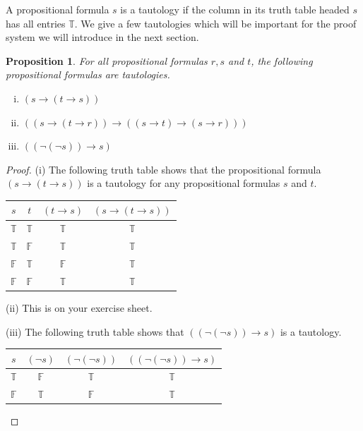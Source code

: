 \documentclass[11pt]{article}
\newtheorem{proposition}[theorem]{Proposition}
\newcommand{\F}{\mathbb{F}}
\newcommand{\T}{\mathbb{T}}
\begin{document}
A propositional formula $s$ is a tautology if the column in its truth table headed $s$ has all entries $\T$. We give a few tautologies which will be important for the proof system we will introduce in the next section.
\begin{proposition}\label{axiomsaretaut}
For all propositional formulas $r, s$ and $t$, the following propositional formulas are tautologies.
\begin{enumerate}[(i)]
\item $(s\rightarrow (t\rightarrow s))$
\item $((s\rightarrow (t\rightarrow r))\rightarrow ((s\rightarrow t)\rightarrow (s\rightarrow r)))$
\item $((\neg(\neg s))\rightarrow s)$
\end{enumerate}
\end{proposition}
\begin{proof}(i) The following truth table shows that the propositional formula $(s\rightarrow (t\rightarrow s))$ is a tautology for any propositional formulas $s$ and $t$.

\medskip
\begin{tabular}{|c|c||c|c|}
  \hline
   $s$ & $t$ & $(t\rightarrow s)$ & $(s\rightarrow (t\rightarrow s))$ \\\hline
  $\T$ & $\T$ & $\T$ & $\T$ \\
  $\T$ & $\F$ & $\T$ & $\T$ \\
  $\F$ & $\T$ & $\F$ & $\T$ \\
  $\F$ & $\F$ & $\T$ & $\T$ \\
  \hline
\end{tabular}

\medskip

\noindent
(ii) This is on your exercise sheet.

\noindent
(iii) The following truth table shows that $((\neg(\neg s))\rightarrow s)$ is a tautology.

\begin{tabular}{|c||c|c|c|}
  \hline
$s$	&$(\neg s)$	&$(\neg(\neg s))$	& $((\neg(\neg s))\rightarrow s)$\\\hline
$\T$&	$\F$&	$\T$&	$\T$\\
$\F$&	$\T$&	$\F$&	$\T$\\
  \hline
\end{tabular}
\end{proof}
\end{document}
